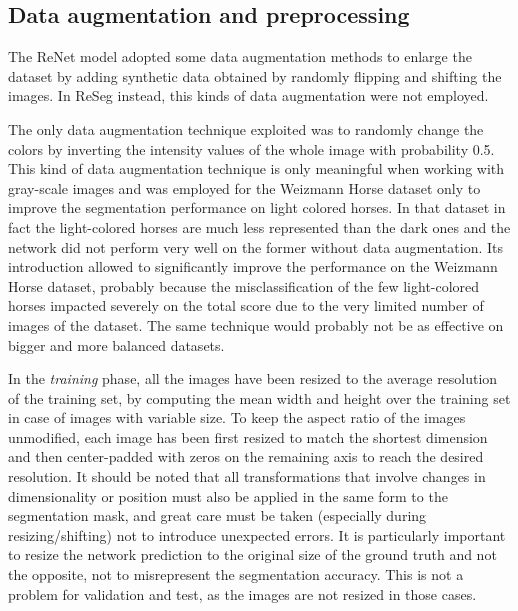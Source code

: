 \subsection{Data augmentation and preprocessing}\label{sec:data_preprocessing}

The ReNet model adopted some data augmentation methods to enlarge the dataset
by adding synthetic data obtained by randomly flipping and shifting the images.
In ReSeg instead, this kinds of data augmentation were not employed.

The only data augmentation technique exploited was to randomly change the
colors by inverting the intensity values of the whole image with probability
0.5. This kind of data augmentation technique is only meaningful when working
with gray-scale images and was employed for the Weizmann Horse dataset only to
improve the segmentation performance on light colored horses. In that dataset
in fact the light-colored horses are much less represented than the dark ones
and the network did not perform very well on the former without data
augmentation. Its introduction allowed to significantly improve the performance
on the Weizmann Horse dataset, probably because the misclassification of the
few light-colored horses impacted severely on the total score due to the very
limited number of images of the dataset. The same technique would probably not
be as effective on bigger and more balanced datasets.

In the \emph{training} phase, all the images have been resized to the average
resolution of the training set, by computing the mean width and height over the
training set in case of images with variable size. To keep the aspect ratio of
the images unmodified, each image has been first resized to match the shortest
dimension and then center-padded with zeros on the remaining axis to reach the
desired resolution. It should be noted that all transformations that involve
changes in dimensionality or position must also be applied in the same form to
the segmentation mask, and great care must be taken (especially during
resizing/shifting) not to introduce unexpected errors. It is particularly
important to resize the network prediction to the original size of the ground
truth and not the opposite, not to misrepresent the segmentation accuracy. This
is not a problem for validation and test, as the images are not resized in
those cases.

